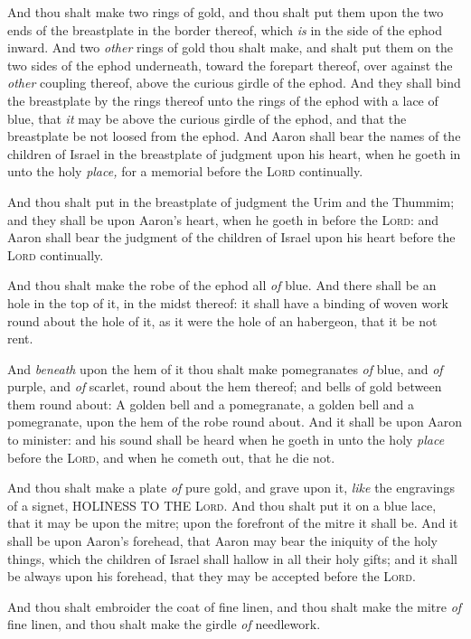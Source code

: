 \documentclass[11pt,letterpaper,oneside]{memoir}
\begin{document}
And thou shalt make two rings of gold, and thou shalt put them upon the
two ends of the breastplate in the border thereof, which \emph{is} in
the side of the ephod inward. And two \emph{other} rings of gold thou
shalt make, and shalt put them on the two sides of the ephod underneath,
toward the forepart thereof, over against the \emph{other} coupling
thereof, above the curious girdle of the ephod. And they shall bind the
breastplate by the rings thereof unto the rings of the ephod with a lace
of blue, that \emph{it} may be above the curious girdle of the ephod,
and that the breastplate be not loosed from the ephod. And Aaron shall
bear the names of the children of Israel in the breastplate of judgment
upon his heart, when he goeth in unto the holy \emph{place,} for a
memorial before the \textsc{Lord} continually.

And thou shalt put in the breastplate of judgment the Urim and the
Thummim; and they shall be upon Aaron's heart, when he goeth in before
the \textsc{Lord}: and Aaron shall bear the judgment of the children of
Israel upon his heart before the \textsc{Lord} continually.

And thou shalt make the robe of the ephod all \emph{of} blue. And there
shall be an hole in the top of it, in the midst thereof: it shall have a
binding of woven work round about the hole of it, as it were the hole of
an habergeon, that it be not rent.

And \emph{beneath} upon the hem of it thou shalt make pomegranates
\emph{of} blue, and \emph{of} purple, and \emph{of} scarlet, round about
the hem thereof; and bells of gold between them round about: A golden
bell and a pomegranate, a golden bell and a pomegranate, upon the hem of
the robe round about. And it shall be upon Aaron to minister: and his
sound shall be heard when he goeth in unto the holy \emph{place} before
the \textsc{Lord}, and when he cometh out, that he die not.

And thou shalt make a plate \emph{of} pure gold, and grave upon it,
\emph{like} the engravings of a signet, HOLINESS TO THE \textsc{Lord}.
And thou shalt put it on a blue lace, that it may be upon the mitre;
upon the forefront of the mitre it shall be. And it shall be upon
Aaron's forehead, that Aaron may bear the iniquity of the holy things,
which the children of Israel shall hallow in all their holy gifts; and
it shall be always upon his forehead, that they may be accepted before
the \textsc{Lord}.

And thou shalt embroider the coat of fine linen, and thou shalt make the
mitre \emph{of} fine linen, and thou shalt make the girdle \emph{of}
needlework.
\end{document}
